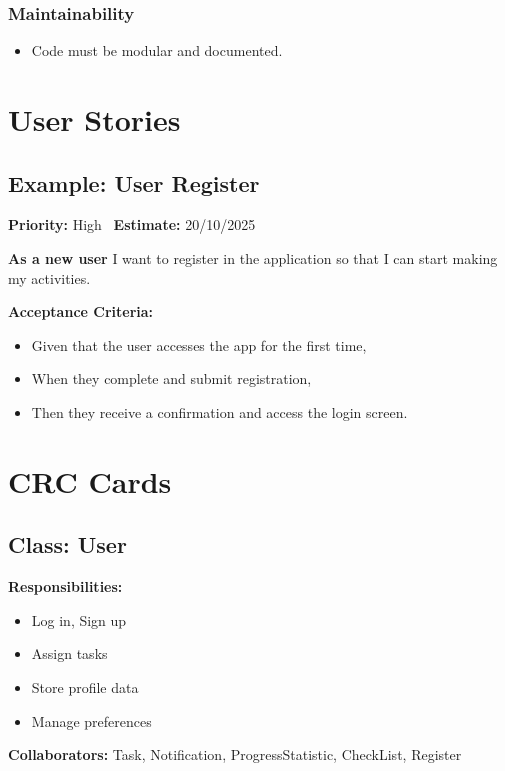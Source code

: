 \documentclass[man]{apa7}
\begin{document}
\subsubsection{Maintainability}
\begin{itemize}
\item Code must be modular and documented.
\end{itemize}

\section{User Stories}
\subsection*{Example: User Register}
\textbf{Priority:} High \
\textbf{Estimate:} 20/10/2025

\textbf{As a new user} I want to register in the application so that I can start making my activities.

\textbf{Acceptance Criteria:}
\begin{itemize}
\item Given that the user accesses the app for the first time,
\item When they complete and submit registration,
\item Then they receive a confirmation and access the login screen.
\end{itemize}


\section{CRC Cards}
\subsection*{Class: User}
\textbf{Responsibilities:}
\begin{itemize}
\item Log in, Sign up
\item Assign tasks
\item Store profile data
\item Manage preferences
\end{itemize}
\textbf{Collaborators:} Task, Notification, ProgressStatistic, CheckList, Register
\end{document}

